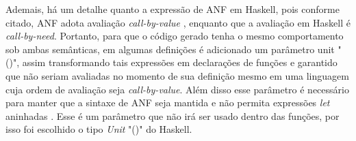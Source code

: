 Ademais, há um detalhe quanto a expressão de ANF em Haskell, pois conforme citado, ANF adota avaliação \emph{call-by-value} \cite{flanagan1993essence}, enquanto que a avaliação em Haskell é \emph{call-by-need}. Portanto, para que o código gerado tenha o mesmo comportamento sob ambas semânticas, em algumas definições é adicionado um parâmetro unit "()", assim transformando tais expressões em declarações de funções e garantido que não seriam avaliadas no momento de sua definição mesmo em uma linguagem cuja ordem de avaliação seja \emph{call-by-value}. Além disso esse parâmetro é necessário para manter que a sintaxe de ANF seja mantida e não permita expressões \emph{let} aninhadas \cite{sabry1992reasoning}. Esse é um parâmetro que não irá ser usado dentro das funções, por isso foi escolhido o tipo \emph{Unit} "()" do Haskell.

